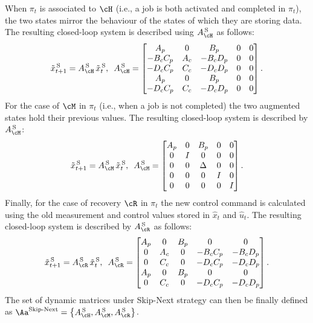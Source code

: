 When $\pi_t$ is associated to $\cH$ (i.e., a job is both activated and completed in $\pi_t$), the two  states mirror the behaviour of the states of which they are storing data.
The resulting closed-loop system is described using $A^{\,\text{S}}_{\cH}$ as follows:
\begin{equation*}
    \tilde x_{t+1}^{\,\text{S}} = A^{\,\text{S}}_{\cH}\,\tilde x_t^{\,\text{S}}, \,\,\,
    A^{\,\text{S}}_{\cH} = \begin{bmatrix}
        A_p       & 0    & B_p      & 0 & 0 \\
        -B_cC_p   & A_c  & -B_cD_p  & 0 & 0 \\
        -D_cC_p   & C_c  & -D_cD_p  & 0 & 0 \\
        A_p       & 0    & B_p      & 0 & 0 \\
        -D_cC_p   & C_c  & -D_cD_p  & 0 & 0 \\
    \end{bmatrix}.
\end{equation*}
%
For the case of $\cM$ in $\pi_t$ (i.e., when a job is not completed) the two augmented states hold their previous values. The
resulting closed-loop system is described by $A^{\,\text{S}}_{\cM}$:
%
\begin{equation*}
    \tilde x_{t+1}^{\,\text{S}} = A^{\,\text{S}}_{\cM}\,\tilde x_t^{\,\text{S}}, \,\,\,
    A^{\,\text{S}}_{\cM}=\begin{bmatrix}
        A_p & 0  & B_p & 0 & 0 \\
        0   & I  & 0   & 0 & 0 \\
        0   & 0  & \Delta   & 0 & 0 \\
        0   & 0  & 0   & I & 0 \\
        0   & 0  & 0   & 0 & I \\
	\end{bmatrix}.
\end{equation*}
%
Finally, for the case of recovery $\cR$ in $\pi_t$ the new control command is calculated using the old measurement and control values stored in $\hat x_t$ and $\hat u_t$.
The resulting closed-loop system is described by $A^{\,\text{S}}_{\cR}$ as follows:
%
\begin{equation*}
    \tilde x_{t+1}^{\,\text{S}} = A^{\,\text{S}}_{\cR} \, \tilde x_{t}^{\,\text{S}},\,\,\,
    A^{\,\text{S}}_{\cR} = \begin{bmatrix}
        A_p & 0    & B_p & 0       & 0 \\
        0   & A_c  & 0   & -B_cC_p & -B_cD_p \\
        0   & C_c  & 0   & -D_cC_p & -D_cD_p \\
        A_p & 0    & B_p & 0       & 0 \\
        0   & C_c  & 0   & -D_cC_p & -D_cD_p \\
    \end{bmatrix}.
\end{equation*}
%
The set of dynamic matrices under Skip-Next strategy can then be finally defined as $\Aa^{\text{Skip-Next}}=\left\{A^{\,\text{S}}_{\cH},A^{\,\text{S}}_{\cM},A^{\,\text{S}}_{\cR}\right\}$.

